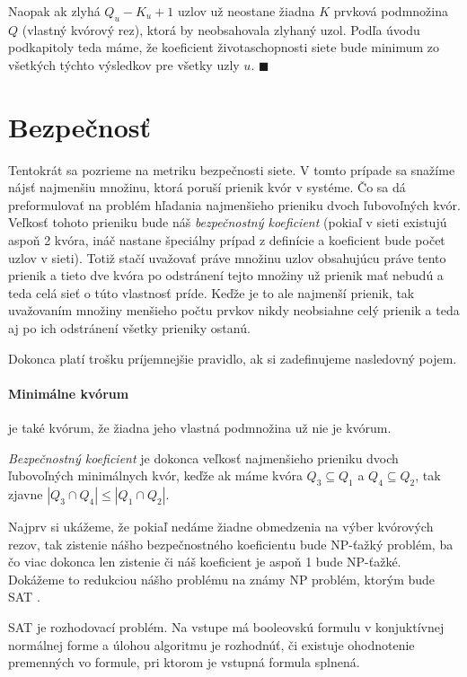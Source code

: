 Naopak ak zlyhá $Q_u-K_u+1$ uzlov už neostane žiadna $K$ prvková podmnožina $Q$
(vlastný kvórový rez), ktorá by neobsahovala zlyhaný uzol.
Podľa úvodu podkapitoly teda máme, že koeficient životaschopnosti siete bude
minimum zo všetkých týchto výsledkov pre všetky uzly $u$. $\blacksquare$

\section {Bezpečnosť}

\label{kap:security}

Tentokrát sa pozrieme na metriku bezpečnosti siete. V tomto prípade sa snažíme
nájsť najmenšiu množinu, ktorá poruší prienik kvór v systéme. Čo sa dá preformulovať
na problém hľadania najmenšieho prieniku dvoch ľubovoľných kvór. Veľkosť tohoto
prieniku bude náš \textit{bezpečnostný koeficient} (pokiaľ v sieti existujú aspoň 2 kvóra,
ináč nastane špeciálny prípad z definície a koeficient bude počet uzlov v sieti).
Totiž stačí uvažovať práve množinu uzlov obsahujúcu práve tento prienik a tieto
dve kvóra po odstránení tejto množiny už prienik mať nebudú a teda celá sieť o túto
vlastnosť príde.
Keďže je to ale najmenší prienik, tak uvažovaním množiny menšieho počtu prvkov
nikdy neobsiahne celý prienik a teda aj po ich odstránení všetky prieniky ostanú.

Dokonca platí trošku príjemnejšie pravidlo, ak si zadefinujeme nasledovný pojem.

\paragraph {Minimálne kvórum} je také kvórum, že žiadna jeho vlastná podmnožina
už nie je kvórum.

\vspace{3mm}
\textit{Bezpečnostný koeficient} je dokonca veľkosť najmenšieho prieniku dvoch
ľubovoľných minimálnych kvór, keďže ak máme kvóra $Q_3\subseteq Q_1$ a $Q_4\subseteq Q_2$,
tak zjavne $|Q_3\cap Q_4|\leq |Q_1\cap Q_2|$.

\vspace{4mm}
Najprv si ukážeme, že pokiaľ nedáme žiadne obmedzenia na výber kvórových rezov,
tak zistenie nášho bezpečnostného koeficientu bude NP-ťažký problém, ba čo viac
dokonca len zistenie či náš koeficient je aspoň 1 bude NP-ťažké.
Dokážeme to redukciou nášho problému na známy NP problém, ktorým bude SAT
\cite{cook1971complexity}.

SAT je rozhodovací problém. Na vstupe má booleovskú formulu v konjuktívnej normálnej
forme a úlohou algoritmu je rozhodnúť, či existuje ohodnotenie premenných vo formule,
pri ktorom je vstupná formula splnená.

